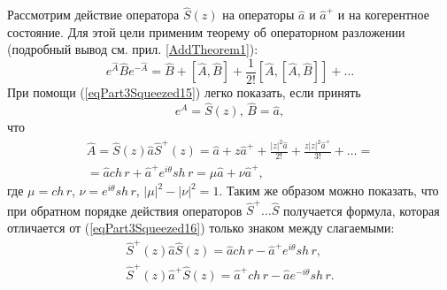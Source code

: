 Рассмотрим действие оператора $\hat{S}\left(z\right)$ на операторы
$\hat{a}$ и $\hat{a}^{+}$ и на когерентное состояние. Для этой цели
применим теорему об операторном разложении (подробный вывод
см. прил. \ref{AddTheorem1}):  
\begin{equation}
e^{\hat{A}}\hat{B}e^{-\hat{A}} = 
\hat{B} + \left[\hat{A},\hat{B}\right] + 
\frac{1}{2!} \left[\hat{A},\left[\hat{A},\hat{B}\right]\right] + \dots
\label{eqPart3Squeezed15}
\end{equation}
При помощи (\ref{eqPart3Squeezed15}) легко показать, если принять
\[
e^{\hat{A}} = \hat{S}\left(z\right), \, \hat{B} = \hat{a},
\]
что
\begin{eqnarray}
\hat{A} = \hat{S}\left(z\right)\hat{a}\hat{S}^{+}\left(z\right) =
\hat{a} + z \hat{a}^{+} + \frac{\left|z\right|^2\hat{a}}{2!} +
\frac{z\left|z\right|^2\hat{a}^{+}}{3!} + \dots = 
\nonumber \\
=\hat{a} ch\,r + \hat{a}^{+} e^{i\theta} sh \, r = 
\mu \hat{a} + \nu \hat{a}^{+},
\label{eqPart3Squeezed16}
\end{eqnarray}
где $\mu = ch\,r$, $\nu = e^{i\theta} sh\,r$, $\left|\mu\right|^2 -
\left|\nu\right|^2  = 1$.
Таким же образом можно показать, что при обратном порядке действия
операторов $\hat{S}^{+}\dots\hat{S}$ получается формула, которая
отличается от (\ref{eqPart3Squeezed16}) только знаком между
слагаемыми:
\begin{eqnarray}
\hat{S}^{+}\left(z\right)\hat{a}\hat{S}\left(z\right) 
=\hat{a} ch\,r - \hat{a}^{+} e^{i\theta} sh \, r,
\nonumber \\
\hat{S}^{+}\left(z\right)\hat{a}^{+}\hat{S}\left(z\right) 
=\hat{a}^{+} ch\,r - \hat{a} e^{-i\theta} sh \, r.
\label{eqPart3Squeezed16a}
\end{eqnarray}

